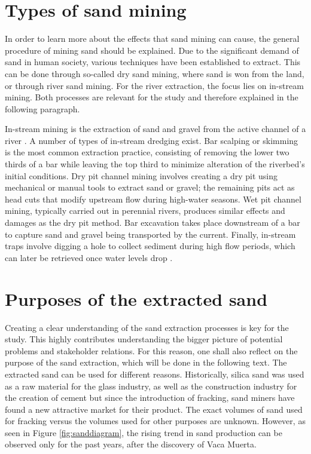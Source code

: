 \section{Types of sand mining}
In order to learn more about the effects that sand mining can cause, the general procedure of mining sand should be explained. Due to the significant demand of sand in human society, various techniques have been established to extract. This can be done through so-called dry sand mining, where sand is won from the land, or through river sand mining. For the river extraction, the focus lies on in-stream mining. Both processes are relevant for the study and therefore explained in the following paragraph.

In-stream mining is the extraction of sand and gravel from the active channel of a river \autocite{sand-mining-boek}. A number of types of in-stream dredging exist. Bar scalping or skimming is the most common extraction practice, consisting of removing the lower two thirds of a bar while leaving the top third to minimize alteration of the riverbed’s initial conditions. Dry pit channel mining involves creating a dry pit using mechanical or manual tools to extract sand or gravel; the remaining pits act as head cuts that modify upstream flow during high-water seasons. Wet pit channel mining, typically carried out in perennial rivers, produces similar effects and damages as the dry pit method. Bar excavation takes place downstream of a bar to capture sand and gravel being transported by the current. Finally, in-stream traps involve digging a hole to collect sediment during high flow periods, which can later be retrieved once water levels drop \autocite{sand-mining-boek}.

\section{Purposes of the extracted sand}
Creating a clear understanding of the sand extraction processes is key for the study. This highly contributes understanding the bigger picture of potential problems and stakeholder relations. For this reason, one shall also reflect on the purpose of the sand extraction, which will be done in the following text. The extracted sand can be used for different reasons. Historically, silica sand was used as a raw material for the glass industry, as well as the construction industry for the creation of cement but since the introduction of fracking, sand miners have found a new attractive market for their product. The exact volumes of sand used for fracking versus the volumes used for other purposes are unknown. However, as seen in Figure \ref{fig:sanddiagram}, the rising trend in sand production can be observed only for the past years, after the discovery of Vaca Muerta.

